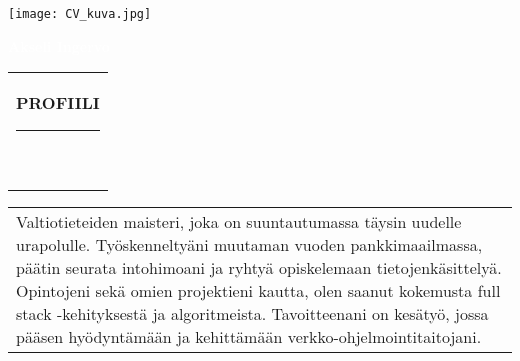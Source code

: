 \documentclass[10pt]{article}
\newcommand{\mpwidth}{\linewidth-\fboxsep-\fboxsep}
\newcommand{\cvtext}[1] {
	\begin{tabular*}{1\mpwidth}{p{0.98\mpwidth}}
		\parbox{1\mpwidth}{#1}
	\end{tabular*}
}
\newcommand{\cvsection}[1] {
	\vspace{14pt}
	\cvtext{
		\textbf{\LARGE{\textcolor{darkcol}{\uppercase{#1}}}}\\[-4pt]
		\textcolor{maincol}{ \rule{0.1\textwidth}{2pt} } \\
	}
}
\begin{document}
\setlength{\columnsep}{2.2em}
\setlength{\columnseprule}{4pt}

\begin{paracol}{2}
\begin{leftcolumn}
 \texttt{[image: CV\_kuva.jpg]}


 \vspace{2mm}
 \colorbox{darkcol}{
 \begin{minipage}[c][1cm][c]{.97\mpwidth}
  \begin{center}
   \LARGE{
	\textbf{
	 \textcolor{white}{Akseli Ingervo}
	}
   }
  \end{center}
 \end{minipage}
 }



 \null
 \cvsection{PROFIILI}

 \small\cvtext{
  Valtiotieteiden maisteri, joka on suuntautumassa täysin uudelle urapolulle.
  Työskenneltyäni muutaman vuoden pankkimaailmassa, päätin seurata intohimoani
  ja ryhtyä opiskelemaan tietojenkäsittelyä.
  Opintojeni sekä omien projektieni kautta, olen saanut kokemusta
  full stack -kehityksestä ja algoritmeista. Tavoitteenani on kesätyö, jossa
  pääsen hyödyntämään ja kehittämään verkko-ohjelmointitaitojani.
 } \\[4mm]


\end{leftcolumn}
\end{paracol}
\end{document}
